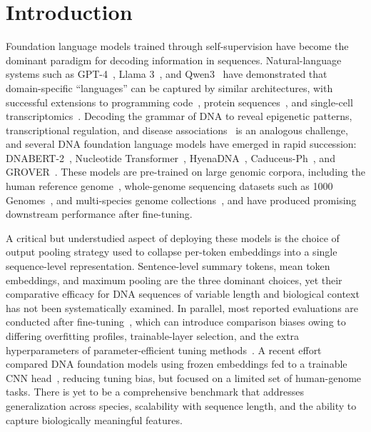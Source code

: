 \documentclass[11pt,a4paper]{article}
\begin{document}
\section{Introduction}
Foundation language models trained through self-supervision have become the dominant paradigm for decoding information in sequences. Natural-language systems such as GPT-4~\citep{openai2023gpt4}, Llama 3~\citep{grattafiori2024llama}, and Qwen3~\citep{yang2025qwen3} have demonstrated that domain-specific ``languages'' can be captured by similar architectures, with successful extensions to programming code~\citep{chen2021codex}, protein sequences~\citep{rives2021biological, lin2023esm2}, and single-cell transcriptomics~\citep{cui2024scgpt}. Decoding the grammar of DNA to reveal epigenetic patterns, transcriptional regulation, and disease associations~\citep{encode2012integrated, roadmap2015integrative} is an analogous challenge, and several DNA foundation language models have emerged in rapid succession: DNABERT-2~\citep{zhou2023dnabert2}, Nucleotide Transformer~\citep{dalla2023nucleotide}, HyenaDNA~\citep{nguyen2023hyenadna}, Caduceus-Ph~\citep{schiff2024caduceus}, and GROVER~\citep{sanabria2024grover}. These models are pre-trained on large genomic corpora, including the human reference genome~\citep{lander2001initial}, whole-genome sequencing datasets such as 1000 Genomes~\citep{1000genomes2015global}, and multi-species genome collections~\citep{zhou2023dnabert2, dalla2023nucleotide}, and have produced promising downstream performance after fine-tuning.

A critical but understudied aspect of deploying these models is the choice of output pooling strategy used to collapse per-token embeddings into a single sequence-level representation. Sentence-level summary tokens, mean token embeddings, and maximum pooling are the three dominant choices, yet their comparative efficacy for DNA sequences of variable length and biological context has not been systematically examined. In parallel, most reported evaluations are conducted after fine-tuning~\citep{zhou2023dnabert2, dalla2023nucleotide, nguyen2023hyenadna}, which can introduce comparison biases owing to differing overfitting profiles, trainable-layer selection, and the extra hyperparameters of parameter-efficient tuning methods~\citep{hu2022lora, liu2022ptuning}. A recent effort compared DNA foundation models using frozen embeddings fed to a trainable CNN head~\citep{marin2024benchmarking}, reducing tuning bias, but focused on a limited set of human-genome tasks. There is yet to be a comprehensive benchmark that addresses generalization across species, scalability with sequence length, and the ability to capture biologically meaningful features.
\end{document}
